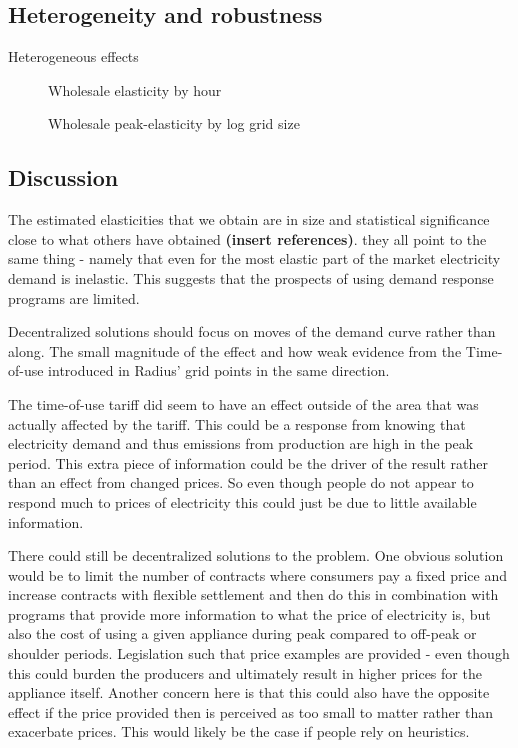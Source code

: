 \subsection{Heterogeneity and robustness}
\label{subsec:r_robustness}


Heterogeneous effects
\begin{figure}[H]
  \centering
  \caption{Wholesale elasticity by hour}
  \label{fig:ws_elasticity_hour}
\end{figure}

\begin{figure}[H]
  \centering
  \caption{Wholesale peak-elasticity by log grid size}
  \label{fig:ws_elasticity_grid}
\end{figure}


\subsection{Discussion}
\label{subsec:r_discussion}

The estimated elasticities that we obtain are in size and statistical significance close to what others have obtained\textbf{ (insert references)}.  they all point to the same thing - namely that even for the most elastic part of the market electricity demand is inelastic. This suggests that the prospects of using demand response programs are limited.

Decentralized solutions should focus on moves of the demand curve rather than along.
The small magnitude of the effect and how weak evidence from the Time-of-use introduced in Radius' grid points in the same direction.
\par

The time-of-use tariff did seem to have an effect outside of the area that was actually affected by the tariff. This could be a response from knowing that electricity demand and thus emissions from production are high in the peak period. This extra piece of information could be the driver of the result rather than an effect from changed prices. So even though people do not appear to respond much to prices of electricity this could just be due to little available information.
\par

There could still be decentralized solutions to the problem. One obvious solution would be to limit the number of contracts where consumers pay a fixed price and increase contracts with flexible settlement and then do this in combination with programs that provide more information to what the price of electricity is, but also the cost of using a given appliance during peak compared to off-peak or shoulder periods. Legislation such that price examples are provided - even though this could burden the producers and ultimately result in higher prices for the appliance itself. Another concern here is that this could also have the opposite effect if the price provided then is perceived as too small to matter rather than exacerbate prices. This would likely be the case if people rely on heuristics.
\par

